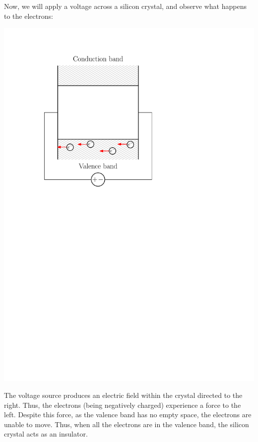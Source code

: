 \documentclass[letterpaper]{article}
\theoremstyle{remark}
\begin{document}
Now, we will apply a voltage across a silicon crystal, and observe what happens to the electrons:
\begin{center}
    \includegraphics[scale=0.7]{si_voltage_band.pdf}
\end{center}

The voltage source produces an electric field within the crystal directed to the right. Thus, the electrons (being negatively charged) experience a force to the left. Despite this force, as the valence band has no empty space, the electrons are unable to move. Thus, when all the electrons are in the valence band, the silicon crystal acts as an insulator.
\end{document}

